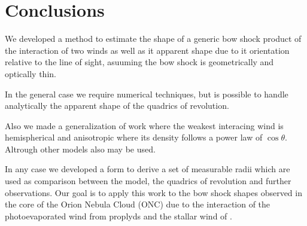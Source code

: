 \section{Conclusions}
\label{sec:conc}


We developed a method to estimate the shape of a generic bow shock product of the
interaction of two winds as well as it apparent shape due to it orientation relative to the line of sight, asuuming
the bow shock is geometrically and optically thin.

In the general case we require numerical techniques, but is possible to handle analytically the apparent shape of
the quadrics of revolution. 

Also we made a generalization of \CRW{} work where the weakest interacing wind is hemispherical and anisotropic where its
density follows a power law of $\cos\theta$. Altrough other models also may be used.

In any case we developed a form to derive a set of measurable radii which are used as comparison between the \CRW{} model, the quadrics
of revolution and further observations. Our goal is to apply this work to the bow shock shapes observed in the core of the Orion Nebula Cloud
(ONC) due to the interaction of the photoevaporated wind from proplyds and the stallar wind of \thC{}.



